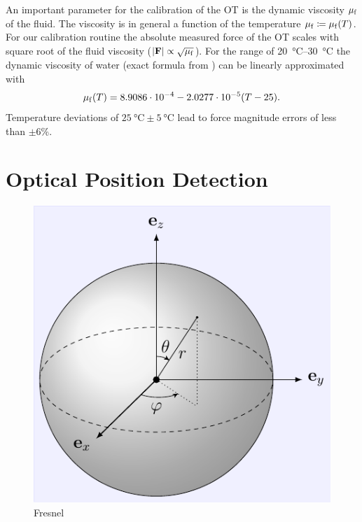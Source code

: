 An important parameter for the calibration of the OT is the dynamic viscosity 
$\mu_{\mathrm{f}}$ of the fluid. The viscosity is in general a function of the temperature 
$\mu_{\mathrm{f}}\coloneqq\mu_{\mathrm{f}}(T)$. For our calibration routine the absolute measured 
force of the OT scales with square root of the fluid viscosity 
($\abs{\vb{F}}\propto\sqrt{\mu_{\mathrm{f}}}$). For the range of 
\SIrange{20}{30}{\degreeCelsius} the dynamic viscosity of water (exact formula 
from \cite{Peterman2003}) can be linearly approximated with
\begin{equation}
  \mu_{\mathrm{f}}(T) = 8.9086\cdot 10^{-4} -2.0277\cdot10^{-5} (T-25).
  \label{eq:Th-viscosity}
\end{equation}
Temperature deviations of $\SI{25}{\degreeCelsius}\pm\SI{5}{\degreeCelsius}$ 
lead to force magnitude errors of less than $\pm$6\%.


\section{Optical Position Detection\label{sec:Th-QPD}}

\begin{figure}[tbp]
  \centering
  \includegraphics[]{Plots/cache/coordinate.pdf}
  \caption{Fresnel}
  \label{fig:Th-coordinate}
\end{figure}


